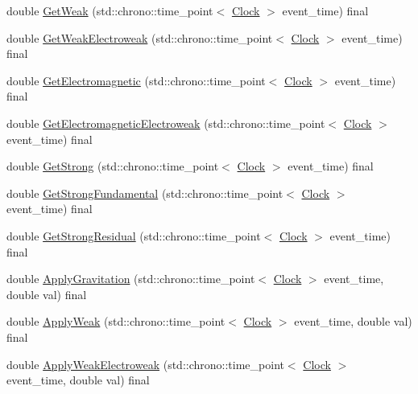 \begin{DoxyCompactItemize}
\item 
double \hyperlink{class_cognitive_network_a761db75ac8eab7b4625e5a398891bd12}{Get\+Weak} (std\+::chrono\+::time\+\_\+point$<$ \hyperlink{universe_8h_a0ef8d951d1ca5ab3cfaf7ab4c7a6fd80}{Clock} $>$ event\+\_\+time) final
\item 
double \hyperlink{class_cognitive_network_aa6342c390fe8e7c648b4c6bc8f93ba4a}{Get\+Weak\+Electroweak} (std\+::chrono\+::time\+\_\+point$<$ \hyperlink{universe_8h_a0ef8d951d1ca5ab3cfaf7ab4c7a6fd80}{Clock} $>$ event\+\_\+time) final
\item 
double \hyperlink{class_cognitive_network_a09e5a1c774c84529a7adfe56fadb7467}{Get\+Electromagnetic} (std\+::chrono\+::time\+\_\+point$<$ \hyperlink{universe_8h_a0ef8d951d1ca5ab3cfaf7ab4c7a6fd80}{Clock} $>$ event\+\_\+time) final
\item 
double \hyperlink{class_cognitive_network_a8c4e0454068f714691ae250f795cdb67}{Get\+Electromagnetic\+Electroweak} (std\+::chrono\+::time\+\_\+point$<$ \hyperlink{universe_8h_a0ef8d951d1ca5ab3cfaf7ab4c7a6fd80}{Clock} $>$ event\+\_\+time) final
\item 
double \hyperlink{class_cognitive_network_a277247686f8af159e7a7beb0ec379225}{Get\+Strong} (std\+::chrono\+::time\+\_\+point$<$ \hyperlink{universe_8h_a0ef8d951d1ca5ab3cfaf7ab4c7a6fd80}{Clock} $>$ event\+\_\+time) final
\item 
double \hyperlink{class_cognitive_network_a942ca90561fedae46136de620accbfea}{Get\+Strong\+Fundamental} (std\+::chrono\+::time\+\_\+point$<$ \hyperlink{universe_8h_a0ef8d951d1ca5ab3cfaf7ab4c7a6fd80}{Clock} $>$ event\+\_\+time) final
\item 
double \hyperlink{class_cognitive_network_acfa5de663b3e686c4d9ea1a3bb483b11}{Get\+Strong\+Residual} (std\+::chrono\+::time\+\_\+point$<$ \hyperlink{universe_8h_a0ef8d951d1ca5ab3cfaf7ab4c7a6fd80}{Clock} $>$ event\+\_\+time) final
\item 
double \hyperlink{class_cognitive_network_a7d3252977440a9a5c004f748647ce885}{Apply\+Gravitation} (std\+::chrono\+::time\+\_\+point$<$ \hyperlink{universe_8h_a0ef8d951d1ca5ab3cfaf7ab4c7a6fd80}{Clock} $>$ event\+\_\+time, double val) final
\item 
double \hyperlink{class_cognitive_network_a46a15b24bd61049fa1c4f635268086a1}{Apply\+Weak} (std\+::chrono\+::time\+\_\+point$<$ \hyperlink{universe_8h_a0ef8d951d1ca5ab3cfaf7ab4c7a6fd80}{Clock} $>$ event\+\_\+time, double val) final
\item 
double \hyperlink{class_cognitive_network_ab8bc213d2806f0dc49c1284bf934fc24}{Apply\+Weak\+Electroweak} (std\+::chrono\+::time\+\_\+point$<$ \hyperlink{universe_8h_a0ef8d951d1ca5ab3cfaf7ab4c7a6fd80}{Clock} $>$ event\+\_\+time, double val) final

\end{DoxyCompactItemize}
